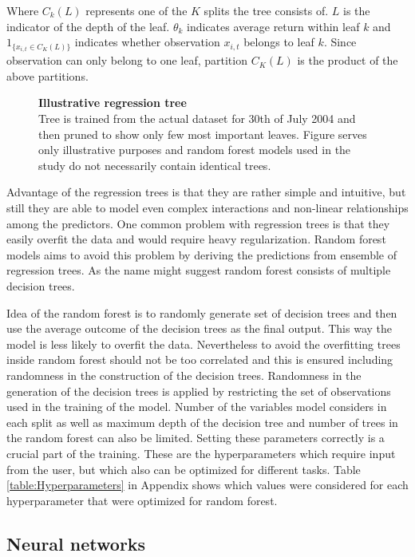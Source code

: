 \documentclass{article}
\begin{document}
Where $C_k(L)$ represents one of the $K$ splits the tree consists of. $L$ is the indicator of the depth of the leaf. $\theta_k$ indicates average return within leaf $k$ and $1 _{\{x_{i, t} \in C_K(L)\}}$ indicates whether observation $x_{i, t}$ belongs to leaf $k$. Since observation can only belong to one leaf, partition $C_K(L)$ is the product of the above partitions.

\begin{figure}[ht]
\centering
\caption[Illustrative regression tree]{\textbf{Illustrative regression tree}\\ Tree is trained from the actual dataset for 30th of July 2004 and then pruned to show only few most important leaves. Figure serves only illustrative purposes and random forest models used in the study do not necessarily contain identical trees. }

\label{plot:regre_tree}
\end{figure}

Advantage of the regression trees is that they are rather simple and intuitive, but still they are able to model even complex interactions and non-linear relationships among the predictors. One common problem with regression trees is that they easily overfit the data and would require heavy regularization. Random forest models aims to avoid this problem by deriving the predictions from ensemble of regression trees. As the name might suggest random forest consists of multiple decision trees. 

Idea of the random forest is to randomly generate set of decision trees and then use the average outcome of the decision trees as the final output. This way the model is less likely to overfit the data. Nevertheless to avoid the overfitting trees inside random forest should not be too correlated and this is ensured including randomness in the construction of the decision trees. Randomness in the generation of the decision trees is applied by restricting the set of observations used in the training of the model. Number of the variables model considers in each split as well as maximum depth of the decision tree and number of trees in the random forest can also be limited. Setting these parameters correctly is a crucial part of the training. These are the hyperparameters which require input from the user, but which also can be optimized for different tasks. Table \ref{table:Hyperparameters} in Appendix shows which values were considered for each hyperparameter that were optimized for random forest.

\subsection{Neural networks}
\end{document}
